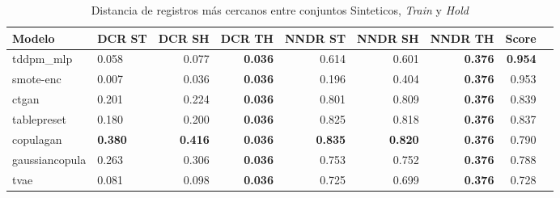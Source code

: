 \begin{table}[H]
\centering
\caption{Distancia de registros más cercanos entre conjuntos Sinteticos, \emph{Train} y \emph{Hold}}
\label{table-dcr-king county-a-3}
\begin{tabular}{|l|l|r|r|r|r|r|r|r|}
\hline
\rowcolor[gray]{0.8}
Modelo & DCR ST & DCR SH & DCR TH & NNDR ST & NNDR SH & NNDR TH & \textbf{Score} \\
\hline tddpm\_mlp & 0.058 & 0.077 & \bfseries 0.036 & 0.614 & 0.601 & \bfseries 0.376 & \bfseries 0.954 \\
\hline smote-enc & \cellcolor[rgb]{0.9, 0.54, 0.52} 0.007 & \cellcolor[rgb]{0.9, 0.54, 0.52} 0.036 & \bfseries 0.036 & 0.196 & 0.404 & \bfseries 0.376 & 0.953 \\
\hline ctgan & 0.201 & 0.224 & \bfseries 0.036 & 0.801 & 0.809 & \bfseries 0.376 & 0.839 \\
\hline tablepreset & 0.180 & 0.200 & \bfseries 0.036 & 0.825 & 0.818 & \bfseries 0.376 & 0.837 \\
\hline copulagan & \bfseries 0.380 & \bfseries 0.416 & \bfseries 0.036 & \bfseries 0.835 & \bfseries 0.820 & \bfseries 0.376 & 0.790 \\
\hline gaussiancopula & 0.263 & 0.306 & \bfseries 0.036 & 0.753 & 0.752 & \bfseries 0.376 & 0.788 \\
\hline tvae & 0.081 & 0.098 & \bfseries 0.036 & 0.725 & 0.699 & \bfseries 0.376 & 0.728 \\
\hline
\end{tabular}
\end{table}
